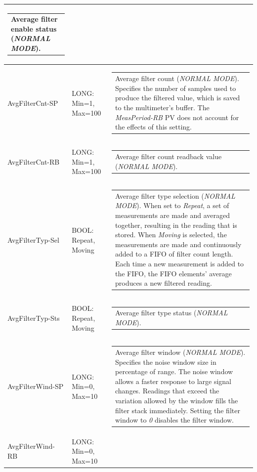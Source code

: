 \documentclass[openany]{article}
\begin{document}
\begin{longtable}{| m{3.0cm} m{4.5cm} m{7.0cm} |}
\begin{tabular}{@{}m{6cm}@{}}
	    					Average filter enable status (\emph{NORMAL MODE}).
						\end{tabular} \\ \hline
		AvgFilterCnt-SP & LONG: Min=1, Max=100 & \begin{tabular}{@{}m{6cm}@{}}
	    					Average filter count (\emph{NORMAL MODE}). Specifies the number of samples used to produce the filtered value, which is saved to the multimeter's buffer. The \emph{MeasPeriod-RB} PV does not account for the effects of this setting.
						\end{tabular} \\ \hline
		AvgFilterCnt-RB & LONG: Min=1, Max=100 & \begin{tabular}{@{}m{6cm}@{}}
	    					Average filter count readback value (\emph{NORMAL MODE}).
						\end{tabular} \\ \hline
		AvgFilterTyp-Sel & BOOL: Repeat, Moving & \begin{tabular}{@{}m{6cm}@{}}
	    					Average filter type selection (\emph{NORMAL MODE}). When set to \emph{Repeat}, a set of measurements are made and averaged together, resulting in the reading that is stored. When \emph{Moving} is selected, the measurements are made and continuously added to a FIFO of filter count length. Each time a new measurement is added to the FIFO, the FIFO elements' average produces a new filtered reading.
						\end{tabular} \\ \hline
		AvgFilterTyp-Sts & BOOL: Repeat, Moving & \begin{tabular}{@{}m{6cm}@{}}
	    					Average filter type status (\emph{NORMAL MODE}).
						\end{tabular} \\ \hline
		AvgFilterWind-SP & LONG: Min=0, Max=10 & \begin{tabular}{@{}m{6cm}@{}}
	    					Average filter window (\emph{NORMAL MODE}). Specifies the noise window size in percentage of range. The noise window allows a faster response to large signal changes. Readings that exceed the variation allowed by the window fills the filter stack immediately. Setting the filter window to \emph{0} disables the filter window.
						\end{tabular} \\ \hline
		AvgFilterWind-RB & LONG: Min=0, Max=10 & \begin{tabular}{@{}m{6cm}@{}}

\end{tabular}
\end{longtable}
\end{document}
